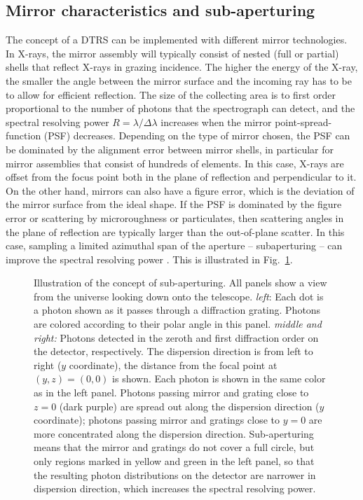 \documentclass[twocolumn]{aastex631}
\begin{document}
\subsection{Mirror characteristics and sub-aperturing}
The concept of a DTRS can be implemented with different mirror technologies. In X-rays, the mirror assembly will typically consist of nested (full or partial) shells that reflect X-rays in grazing incidence. The higher the energy of the X-ray, the smaller the angle between the mirror surface and the incoming ray has to be to allow for efficient reflection. The size of the collecting area is to first order proportional to the number of photons that the spectrograph can detect, and the spectral resolving power $R=\lambda / \Delta \lambda$ increases when the mirror point-spread-function (PSF) decreases. Depending on the type of mirror chosen, the PSF can be dominated by the alignment error between mirror shells, in particular for mirror assemblies that consist of hundreds of elements. In this case, X-rays are offset from the focus point both in the plane of reflection and perpendicular to it.
On the other hand, mirrors can also have a figure error, which is the deviation of the mirror surface from the ideal shape. If the PSF is dominated by the figure error or scattering by microroughness or particulates, then scattering angles in the plane of reflection are typically larger than the out-of-plane scatter. In this case, sampling a limited azimuthal span of the aperture -- subaperturing -- can improve the spectral resolving power \citep{1987ApOpt..26.2915C,2010SPIE.7732E..1JH}. This is illustrated in Fig.~\ref{fig:subaperture}.


\begin{figure}
\caption{
    Illustration of the concept of sub-aperturing. All panels show a view from the universe looking down onto the telescope. \emph{left}: Each dot is a photon shown as it passes through a diffraction grating. Photons are colored according to their polar angle in this panel. \emph{middle and right:} Photons detected in the zeroth and first diffraction order on the detector, respectively. The dispersion direction is from left to right ($y$ coordinate), the distance from the focal point at $(y, z) = (0, 0)$ is shown. Each photon is shown in the same color as in the left panel. Photons passing mirror and grating close to $z=0$ (dark purple) are spread out along the dispersion direction ($y$ coordinate); photons passing mirror and gratings close to $y=0$ are more concentrated along the dispersion direction. Sub-aperturing means that the mirror and gratings do not cover a full circle, but only regions marked in yellow and green in the left panel, so that the resulting photon distributions on the detector are narrower in dispersion direction, which increases the spectral resolving power.}
\label{fig:subaperture}
\end{figure}
\end{document}
